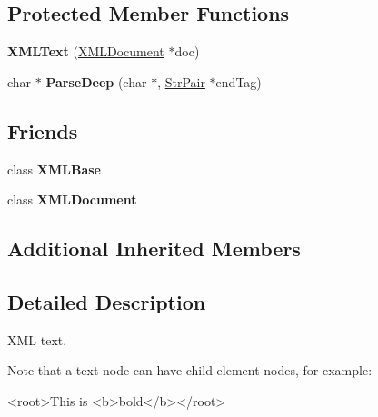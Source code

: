 \subsection*{Protected Member Functions}
\begin{DoxyCompactItemize}
\item 
{\bfseries X\+M\+L\+Text} (\hyperlink{classtinyxml2_1_1_x_m_l_document}{X\+M\+L\+Document} $\ast$doc)\hypertarget{classtinyxml2_1_1_x_m_l_text_ad9f46d70e61e5386ead93728d8b90267}{}\label{classtinyxml2_1_1_x_m_l_text_ad9f46d70e61e5386ead93728d8b90267}

\item 
char $\ast$ {\bfseries Parse\+Deep} (char $\ast$, \hyperlink{classtinyxml2_1_1_str_pair}{Str\+Pair} $\ast$end\+Tag)\hypertarget{classtinyxml2_1_1_x_m_l_text_ac18d9eec9f12b827b0d02b0847bf279e}{}\label{classtinyxml2_1_1_x_m_l_text_ac18d9eec9f12b827b0d02b0847bf279e}

\end{DoxyCompactItemize}
\subsection*{Friends}
\begin{DoxyCompactItemize}
\item 
class {\bfseries X\+M\+L\+Base}\hypertarget{classtinyxml2_1_1_x_m_l_text_a449202cfc89e7ae5c2f81995476f9ec1}{}\label{classtinyxml2_1_1_x_m_l_text_a449202cfc89e7ae5c2f81995476f9ec1}

\item 
class {\bfseries X\+M\+L\+Document}\hypertarget{classtinyxml2_1_1_x_m_l_text_a4eee3bda60c60a30e4e8cd4ea91c4c6e}{}\label{classtinyxml2_1_1_x_m_l_text_a4eee3bda60c60a30e4e8cd4ea91c4c6e}

\end{DoxyCompactItemize}
\subsection*{Additional Inherited Members}


\subsection{Detailed Description}
X\+ML text.

Note that a text node can have child element nodes, for example\+: \begin{DoxyVerb}<root>This is <b>bold</b></root>
\end{DoxyVerb}


